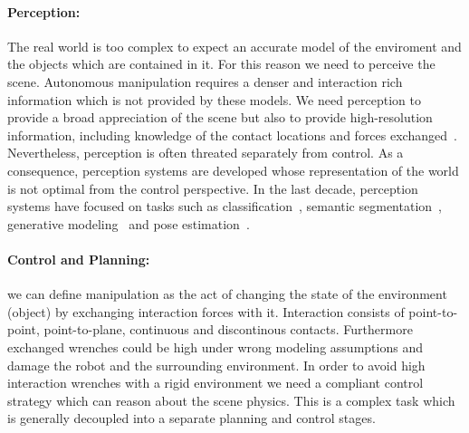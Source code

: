 \paragraph{Perception:} The real world is too complex to expect an accurate model of the enviroment and the objects which are contained in it. For this reason we need to perceive the scene. Autonomous manipulation requires a denser and interaction rich information which is not provided by these models. We need perception to provide a broad appreciation of the scene but also to provide high-resolution information, including knowledge of the contact locations and forces exchanged~\cite{mason2018toward}. Nevertheless, perception is often threated separately from control. As a consequence, perception systems are developed whose representation of the world is not optimal from the control perspective. In the last decade, perception systems have focused on tasks such as classification~\citep{redmon2016you}, semantic segmentation~\cite{badrinarayanan2017segnet}, generative modeling~\citep{karras2019stylebased} and pose estimation~\cite{xiang2017posecnn}. 

\paragraph{Control and Planning:} we can define manipulation as the act of changing the state of the environment (object) by exchanging interaction forces with it. Interaction consists of point-to-point, point-to-plane, continuous and discontinous contacts. Furthermore exchanged wrenches could be high under wrong modeling assumptions and damage the robot and the surrounding environment. In order to avoid high interaction wrenches with a rigid environment we need a compliant control strategy which can reason about the scene physics. This is a complex task which is generally decoupled into a separate planning and control stages.  


